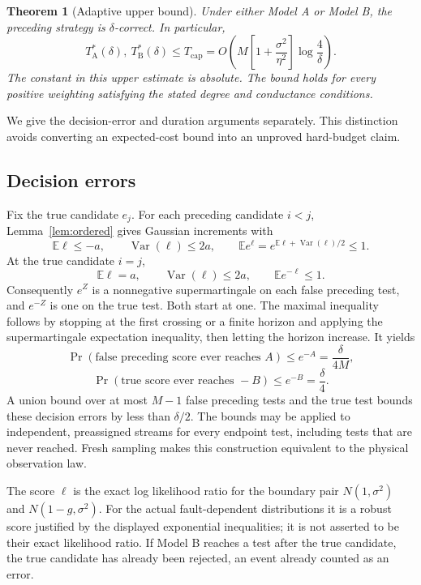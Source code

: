 \documentclass[11pt,letterpaper]{article}
\newtheorem{theorem}{Theorem}
\DeclareMathOperator{\Var}{Var}
\begin{document}
\begin{theorem}[Adaptive upper bound]\label{thm:upper}
Under either Model A or Model B, the preceding strategy is $\delta$-correct. In particular,
\[
 T^*_{\mathrm A}(\delta),\ T^*_{\mathrm B}(\delta)
 \le T_{\mathrm{cap}}
 =O\left(M\left[1+\frac{\sigma^2}{\eta^2}\right]\log\frac4\delta\right).
\]
The constant in this upper estimate is absolute. The bound holds for every positive weighting satisfying the stated degree and conductance conditions.
\end{theorem}

We give the decision-error and duration arguments separately. This distinction avoids converting an expected-cost bound into an unproved hard-budget claim.

\subsection{Decision errors}
Fix the true candidate $e_j$. For each preceding candidate $i<j$, Lemma~\ref{lem:ordered} gives Gaussian increments with
\[
 \mathbb E\ell\le-a,\qquad \Var(\ell)\le2a,\qquad
 \mathbb E e^{\ell}=e^{\mathbb E\ell+\Var(\ell)/2}\le1.
\]
At the true candidate $i=j$,
\[
 \mathbb E\ell=a,\qquad \Var(\ell)\le2a,\qquad
 \mathbb E e^{-\ell}\le1.
\]
Consequently $e^Z$ is a nonnegative supermartingale on each false preceding test, and $e^{-Z}$ is one on the true test. Both start at one. The maximal inequality follows by stopping at the first crossing or a finite horizon and applying the supermartingale expectation inequality, then letting the horizon increase. It yields
\[
 \Pr(\text{false preceding score ever reaches }A)\le e^{-A}=\frac{\delta}{4M},
\]
\[
 \Pr(\text{true score ever reaches }-B)\le e^{-B}=\frac\delta4.
\]
A union bound over at most $M-1$ false preceding tests and the true test bounds these decision errors by less than $\delta/2$. The bounds may be applied to independent, preassigned streams for every endpoint test, including tests that are never reached. Fresh sampling makes this construction equivalent to the physical observation law.

The score $\ell$ is the exact log likelihood ratio for the boundary pair $N(1,\sigma^2)$ and $N(1-g,\sigma^2)$. For the actual fault-dependent distributions it is a robust score justified by the displayed exponential inequalities; it is not asserted to be their exact likelihood ratio. If Model B reaches a test after the true candidate, the true candidate has already been rejected, an event already counted as an error.
\end{document}
